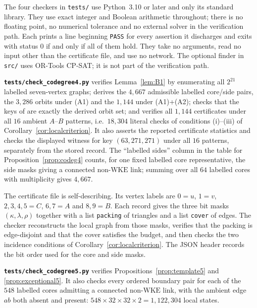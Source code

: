 \documentclass[11pt,a4paper]{amsart}
\theoremstyle{plain}
\theoremstyle{definition}
\newcommand{\WKE}{\mathrm{WKE}}
\begin{document}
The four checkers in \texttt{tests/} use Python~3.10 or later and only its
standard library. They use exact integer and Boolean arithmetic throughout;
there is no floating point, no numerical tolerance and no external solver in
the verification path. Each prints a line beginning
\texttt{PASS} for every assertion it discharges and exits with status $0$ if
and only if all of them hold. They take no arguments, read no input other
than the certificate file, and use no network. The optional finder in
\texttt{src/} uses OR-Tools CP-SAT; it is not part of the verification path.

\medskip
\noindent\textbf{\texttt{tests/check\_codegree4.py}}
verifies Lemma~\ref{lem:B1} by enumerating all $2^{21}$ labelled
seven-vertex graphs; derives the $4{,}667$ admissible
labelled core/side pairs, the $3{,}286$ orbits under (A1) and the $1{,}144$
under (A1)+(A2); checks that the keys of
 are exactly the derived orbit
set; and verifies all $1{,}144$ certificates under all $16$ ambient
$A$--$B$ patterns, i.e.\ $18{,}304$ literal checks of conditions (i)--(iii)
of Corollary~\ref{cor:localcriterion}. It also asserts the reported certificate
statistics and checks the displayed witness for key $(63,271,271)$ under all
$16$ patterns, separately from the stored record. The ``labelled sides'' column in the
table for Proposition~\ref{prop:codeg4} counts, for one fixed labelled core
representative, the side masks giving a connected non-$\WKE$ link; summing
over all $64$ labelled cores with multiplicity gives $4{,}667$.

The certificate file is self-describing. Its vertex labels are
$0=u$, $1=v$, $2,3,4,5=C$, $6,7=A$ and $8,9=B$. Each record gives the three
bit masks $(\kappa,\lambda,\rho)$ together with a list \texttt{packing} of
triangles and a list \texttt{cover} of edges. The checker reconstructs the
local graph from those masks, verifies that the packing is edge-disjoint and
that the cover satisfies the budget, and then checks the two incidence
conditions of Corollary~\ref{cor:localcriterion}. The JSON header records the
bit order used for the core and side masks.

\medskip
\noindent\textbf{\texttt{tests/check\_codegree5.py}}
verifies Propositions~\ref{prop:template5} and
\ref{prop:exceptional5}. It also checks every ordered boundary pair for each of
the $548$ labelled cores admitting a connected non-$\WKE$ link, with the
ambient edge $ab$ both absent and present: $548\times32\times32\times2=
1{,}122{,}304$ local states.
\end{document}
